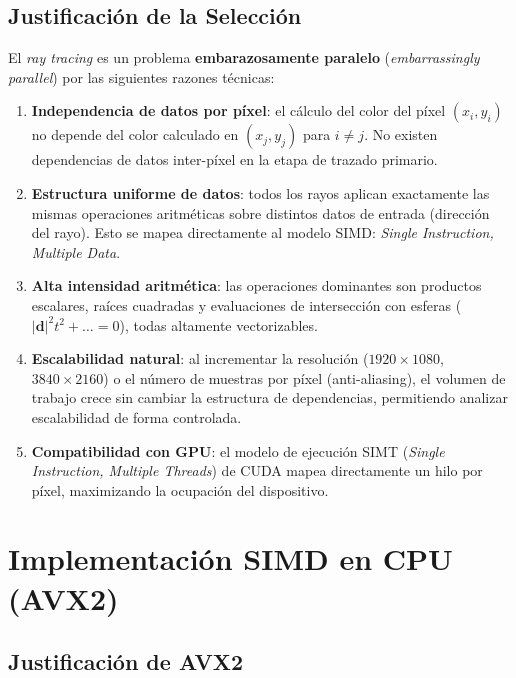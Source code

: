 \documentclass[conference]{IEEEtran}
\begin{document}
\subsection{Justificación de la Selección}

El \textit{ray tracing} es un problema \textbf{embarazosamente paralelo} (\textit{embarrassingly
parallel}) por las siguientes razones técnicas:

\begin{enumerate}
  \item \textbf{Independencia de datos por píxel}: el cálculo del color del píxel
    $(x_i, y_i)$ no depende del color calculado en $(x_j, y_j)$ para $i \neq j$.
    No existen dependencias de datos inter-píxel en la etapa de trazado primario.

  \item \textbf{Estructura uniforme de datos}: todos los rayos aplican exactamente
    las mismas operaciones aritméticas sobre distintos datos de entrada (dirección del rayo).
    Esto se mapea directamente al modelo SIMD: \textit{Single Instruction, Multiple Data}.

  \item \textbf{Alta intensidad aritmética}: las operaciones dominantes son productos
    escalares, raíces cuadradas y evaluaciones de intersección con esferas
    ($|\mathbf{d}|^2 t^2 + \ldots = 0$), todas altamente vectorizables.

  \item \textbf{Escalabilidad natural}: al incrementar la resolución
    ($1920\times1080$, $3840\times2160$) o el número de muestras por píxel
    (anti-aliasing), el volumen de trabajo crece sin cambiar la estructura de
    dependencias, permitiendo analizar escalabilidad de forma controlada.

  \item \textbf{Compatibilidad con GPU}: el modelo de ejecución SIMT
    (\textit{Single Instruction, Multiple Threads}) de CUDA mapea
    directamente un hilo por píxel, maximizando la ocupación del dispositivo.
\end{enumerate}

\section{Implementación SIMD en CPU (AVX2)}

\subsection{Justificación de AVX2}
\end{document}
